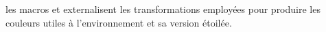 \begin{bdoctopic}
    les macros  et  externalisent les transformations employées pour produire les couleurs utiles à l'environnement  et sa version étoilée.
\end{bdoctopic}
